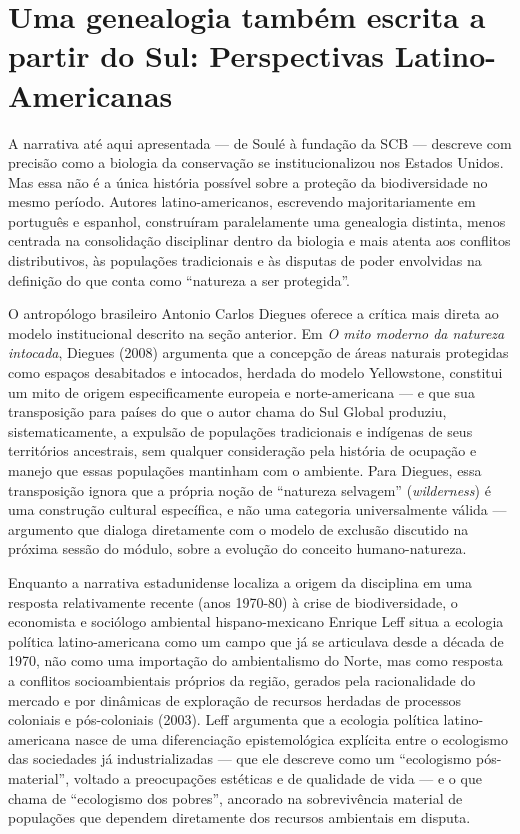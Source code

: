 \documentclass[
  portuguese,
  letterpaper,
  DIV=11,
  numbers=noendperiod]{scrartcl}
\begin{document}
\section{Uma genealogia também escrita a partir do Sul: Perspectivas
Latino-Americanas}\label{uma-genealogia-tambuxe9m-escrita-a-partir-do-sul-perspectivas-latino-americanas}

A narrativa até aqui apresentada --- de Soulé à fundação da SCB ---
descreve com precisão como a biologia da conservação se
institucionalizou nos Estados Unidos. Mas essa não é a única história
possível sobre a proteção da biodiversidade no mesmo período. Autores
latino-americanos, escrevendo majoritariamente em português e espanhol,
construíram paralelamente uma genealogia distinta, menos centrada na
consolidação disciplinar dentro da biologia e mais atenta aos conflitos
distributivos, às populações tradicionais e às disputas de poder
envolvidas na definição do que conta como ``natureza a ser protegida''.

O antropólogo brasileiro Antonio Carlos Diegues oferece a crítica mais
direta ao modelo institucional descrito na seção anterior. Em \emph{O
mito moderno da natureza intocada}, Diegues (2008) argumenta que a
concepção de áreas naturais protegidas como espaços desabitados e
intocados, herdada do modelo Yellowstone, constitui um mito de origem
especificamente europeia e norte-americana --- e que sua transposição
para países do que o autor chama do Sul Global produziu,
sistematicamente, a expulsão de populações tradicionais e indígenas de
seus territórios ancestrais, sem qualquer consideração pela história de
ocupação e manejo que essas populações mantinham com o ambiente. Para
Diegues, essa transposição ignora que a própria noção de ``natureza
selvagem'' (\emph{wilderness}) é uma construção cultural específica, e
não uma categoria universalmente válida --- argumento que dialoga
diretamente com o modelo de exclusão discutido na próxima sessão do
módulo, sobre a evolução do conceito humano-natureza.

Enquanto a narrativa estadunidense localiza a origem da disciplina em
uma resposta relativamente recente (anos 1970-80) à crise de
biodiversidade, o economista e sociólogo ambiental hispano-mexicano
Enrique Leff situa a ecologia política latino-americana como um campo
que já se articulava desde a década de 1970, não como uma importação do
ambientalismo do Norte, mas como resposta a conflitos socioambientais
próprios da região, gerados pela racionalidade do mercado e por
dinâmicas de exploração de recursos herdadas de processos coloniais e
pós-coloniais (2003). Leff argumenta que a ecologia política
latino-americana nasce de uma diferenciação epistemológica explícita
entre o ecologismo das sociedades já industrializadas --- que ele
descreve como um ``ecologismo pós-material'', voltado a preocupações
estéticas e de qualidade de vida --- e o que chama de ``ecologismo dos
pobres'', ancorado na sobrevivência material de populações que dependem
diretamente dos recursos ambientais em disputa.
\end{document}
